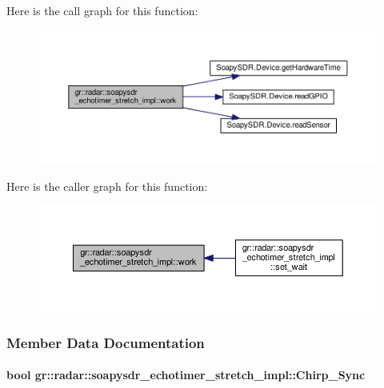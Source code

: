 Here is the call graph for this function\+:
\nopagebreak
\begin{figure}[H]
\begin{center}
\leavevmode
\includegraphics[width=350pt]{d0/dfc/classgr_1_1radar_1_1soapysdr__echotimer__stretch__impl_a461c2cfa0288e59f52272576466c3c4a_cgraph}
\end{center}
\end{figure}




Here is the caller graph for this function\+:
\nopagebreak
\begin{figure}[H]
\begin{center}
\leavevmode
\includegraphics[width=350pt]{d0/dfc/classgr_1_1radar_1_1soapysdr__echotimer__stretch__impl_a461c2cfa0288e59f52272576466c3c4a_icgraph}
\end{center}
\end{figure}




\subsubsection{Member Data Documentation}
\paragraph[{Chirp\+\_\+\+Sync}]{\setlength{\rightskip}{0pt plus 5cm}bool gr\+::radar\+::soapysdr\+\_\+echotimer\+\_\+stretch\+\_\+impl\+::\+Chirp\+\_\+\+Sync\hspace{0.3cm}{\ttfamily [private]}}\label{classgr_1_1radar_1_1soapysdr__echotimer__stretch__impl_a7924ac1e58315ce06c7f5b1d6ba2acf9}


